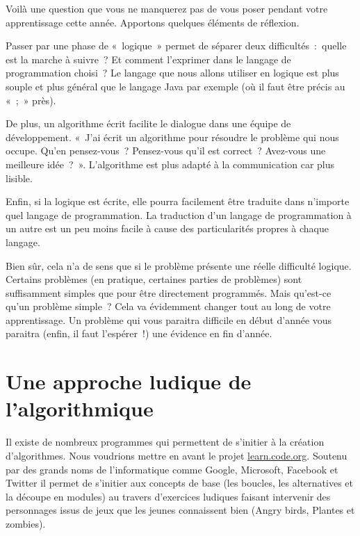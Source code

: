 	Voilà une question que vous ne manquerez pas de vous poser pendant votre
	apprentissage cette année. Apportons quelques éléments de réflexion.

	\begin{liste}
	\item
		Passer par une phase de «~logique~» permet de séparer deux 
		difficultés~:~quelle est la marche à suivre~? Et comment l’exprimer
		dans le langage de programmation choisi~? Le langage que nous allons
		utiliser en logique est plus souple et plus général que le langage Java
		par exemple (où il faut être précis au «~;~» près).
	\item
		De plus, un algorithme écrit facilite le dialogue dans une équipe de
		développement. «~J’ai écrit un algorithme pour
		résoudre le problème qui nous occupe. Qu’en
		pensez-vous~? Pensez-vous qu’il est correct~?
		Avez-vous une meilleure idée~?~». L’algorithme est plus adapté à la
		communication car plus lisible.
	\item
		Enfin, si la logique est écrite, elle pourra facilement être traduite
		dans n’importe quel langage de programmation. La
		traduction d’un langage de programmation à un autre
		est un peu moins facile à cause des particularités propres à chaque
		langage.
	\end{liste}

	Bien sûr, cela n’a de sens que si le problème présente
	une réelle difficulté logique. Certains problèmes (en pratique,
	certaines parties de problèmes) sont suffisamment simples que pour être
	directement programmés. Mais qu’est-ce
	qu’un problème simple~? Cela va évidemment changer
	tout au long de votre apprentissage. Un problème qui vous paraitra
	difficile en début d’année vous paraitra (enfin, il
	faut l’espérer~!) une évidence en fin
	d’année.

\clearpage
\section{Une approche ludique de l'algorithmique}

	Il existe de nombreux programmes qui permettent de s'initier
	à la création d'algorithmes.
	Nous voudrions mettre en avant le projet \url{learn.code.org}.
	Soutenu par des grands noms de l'informatique comme 
	\textsf{Google}, \textsf{Microsoft}, \textsf{Facebook} et \textsf{Twitter}
	il permet de s'initier aux concepts de base
	(les boucles, les alternatives et la découpe en modules)
	au travers d'exercices ludiques faisant intervenir des
	personnages issus de jeux que les jeunes connaissent bien 
	(\textsf{Angry birds}, \textsf{Plantes et zombies}).
	
